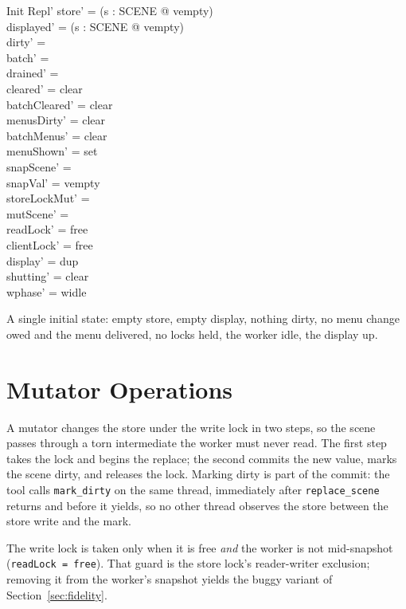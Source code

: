 \documentclass[a4paper,10pt,fleqn]{article}
\begin{document}
\begin{schema}{Init}
  Repl'
\where
  store' = (\lambda s : SCENE @ vempty) \\
  displayed' = (\lambda s : SCENE @ vempty) \\
  dirty' = \emptyset \\
  batch' = \emptyset \\
  drained' = \emptyset \\
  cleared' = clear \\
  batchCleared' = clear \\
  menusDirty' = clear \\
  batchMenus' = clear \\
  menuShown' = set \\
  snapScene' = \emptyset \\
  snapVal' = vempty \\
  storeLockMut' = \emptyset \\
  mutScene' = \emptyset \\
  readLock' = free \\
  clientLock' = free \\
  display' = dup \\
  shutting' = clear \\
  wphase' = widle
\end{schema}

A single initial state: empty store, empty display, nothing dirty, no menu
change owed and the menu delivered, no locks held, the worker idle, the
display up.

\section{Mutator Operations}

A mutator changes the store under the write lock in two steps, so the
scene passes through a torn intermediate the worker must never read.  The
first step takes the lock and begins the replace; the second commits the
new value, marks the scene dirty, and releases the lock.  Marking dirty is
part of the commit: the tool calls \texttt{mark\_dirty} on the same thread,
immediately after \texttt{replace\_scene} returns and before it yields, so
no other thread observes the store between the store write and the mark.

The write lock is taken only when it is free \emph{and} the worker is not
mid-snapshot (\texttt{readLock = free}).  That guard is the store lock's
reader-writer exclusion; removing it from the worker's snapshot yields the
buggy variant of Section~\ref{sec:fidelity}.
\end{document}
